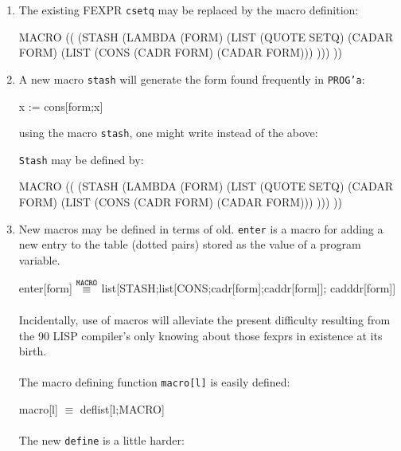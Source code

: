 \documentclass{tufte-handout}
\begin{document}
\begin{enumerate}
\item The existing FEXPR \texttt{csetq} may be replaced by the macro definition:
  \begin{sexp}
    MACRO ((
    (STASH (LAMBDA (FORM) (LIST (QUOTE SETQ) (CADAR FORM) (LIST (CONS (CADR FORM)
    (CADAR FORM))) )))
    ))
  \end{sexp}

\item A new macro \texttt{stash} will generate the form found frequently in
  \texttt{PROG'a}:

  \begin{mexp}
    x := cons[form;x]
  \end{mexp}
  
  using the macro \texttt{stash}, one might write instead of the above:

  \texttt{Stash} may be defined by:
  \begin{sexp}
    MACRO ((
    (STASH (LAMBDA (FORM) (LIST (QUOTE SETQ) (CADAR FORM) (LIST (CONS (CADR FORM)
    (CADAR FORM))) )))
    ))
  \end{sexp}
\item New macros may be defined in terms of old. \texttt{enter} is a macro for
  adding a new entry to the table (dotted pairs) stored as the value of a
  program variable.

  \begin{mexp}
    enter[form] $\overset{\mathtt{MACRO}}{\mathbf{\equiv}}{}$ list[STASH;list[CONS;cadr[form];caddr[form]];
    cadddr[form]]
  \end{mexp}
  \paragraph{}%
  Incidentally, use of macros will alleviate the present difficulty resulting
  from the 90 LISP compiler's only knowing about those fexprs in existence at
  its birth.
  \paragraph{}%
  The macro defining function \texttt{macro[l]} is easily defined:
  
  \begin{mexp}
    macro[l] $\equiv$ deflist[l;MACRO]
  \end{mexp}

  \paragraph{}%
  The new \texttt{define} is a little harder:


\end{enumerate}
\end{document}
